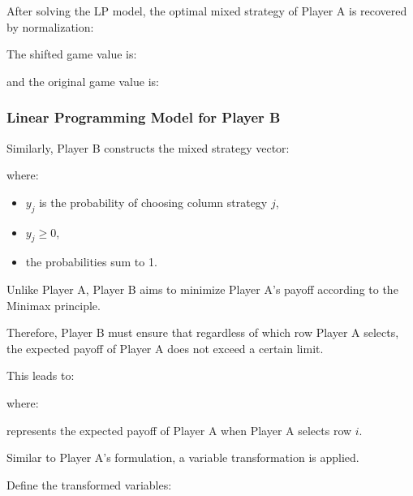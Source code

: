 \documentclass[12pt,a4paper]{article}
\begin{document}
\noindent{}

After solving the LP model, the optimal mixed strategy of Player A is recovered by normalization:

\noindent{}

The shifted game value is:

\noindent{}

and the original game value is:

\noindent{}

\subsubsection{Linear Programming Model for Player B}

Similarly, Player B constructs the mixed strategy vector:

\noindent{}

where:
\begin{itemize}
    \item \(y_j\) is the probability of choosing column strategy \(j\),
    \item \(y_j \ge 0\),
    \item the probabilities sum to 1.
\end{itemize}
Unlike Player A, Player B aims to minimize Player A’s payoff according to the Minimax principle.

Therefore, Player B must ensure that regardless of which row Player A selects, the expected payoff of Player A does not exceed a certain limit.

This leads to:

\noindent{}

where:

\noindent{}

represents the expected payoff of Player A when Player A selects row \(i\).

Similar to Player A’s formulation, a variable transformation is applied. 

Define the transformed variables:

\noindent{}
\end{document}
